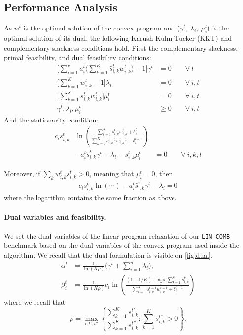 \subsection{Performance Analysis}
As $w^{t}$ is the optimal solution of the convex program and ($\gamma^t,\ \lambda_{i},\ \mu_{i}^{t}$) is the optimal solution of its dual, the following Karush-Kuhn-Tucker (KKT) and complementary slackness conditions hold.
First the complementary slackness, primal feasibility, and dual feasibility conditions:
\begin{align*}
   \biggl[ \sum_{i=1}^{n} a_{i}^{t} \biggl( \sum_{k=1}^{K}  \hat{s}_{i,k}^{t} w_{i,k}^{t} \biggr) - 1 \biggr] \gamma^{t} &= 0 \qquad \forall\ t \\
   \biggl[ \sum_{k=1}^{K}  w_{i,k}^{t}  - 1 \biggr] \lambda_{i} &= 0 \qquad \forall\ i, t \\
   \biggl[ \sum_{k=1}^{K}  s_{i,k}^{t} w_{i,k}^{t} \biggr] \mu_{i}^{t} &= 0 \qquad \forall\ i, t \\
   \gamma^{t}, \lambda_{i}, \mu_{i}^{t} &\geq 0 \qquad \forall\ i, t
\end{align*}
And the stationarity condition:
\begin{align*}
	c_{i} s_{i,k}^{t} & \ln \left( \frac{\sum_{k=1}^{K} s_{i,k}^{t} w_{i,k}^{t} + \delta_{i}^{t}}{\sum_{k=1}^{K}  s_{i,k}^{t-1}w_{i,k}^{t-1}  + \delta_{i}^{t-1}} \right) & \\
    	& - a_{i}^{t} \hat{s}_{i,k}^{t} \gamma^{t} - \lambda_{i} - s_{i,k}^{t} \mu_{i}^{t} &= 0	\qquad \forall\ i,k,t
\end{align*}

Moreover, if $\sum_{k} w_{i,k}^{t} s_{i,k}^{t} > 0$, meaning that $\mu_{i}^{t} = 0$, then
\begin{align}	\label{eq:KKT1}
   c_{i} s_{i,k}^{t} \ln \left( \cdots \right)
    	 - a_{i}^{t} \hat{s}_{i,k}^{t} \gamma^{t} - \lambda_{i}  = 0
\end{align}
where the logarithm contains the same fraction as above.

\paragraph{Dual variables and feasibility.} We set the dual variables of the linear program relaxation of our \texttt{LIN-COMB} benchmark based on the dual variables of the convex program used inside the algorithm. We recall that the dual formulation is visible on \cref{fig:dual}.
%
\begin{align*}
    \alpha^{t} &= \frac{1}{\ln(K\rho)}  \biggl( \gamma^{t} + \sum_{i=1}^{n} \lambda_{i} \biggr), \\
    \beta_{i}^{t} &= \frac{1}{\ln(K\rho)} c_i \ln \left(\frac{ (1 + 1/K) \cdot \max_{t'} \sum_{k=1}^{K} s_{i,k}^{t'}}{\sum_{k=1}^{K}  s_{i,k}^{t-1} w_{i,k}^{t-1} + \delta_{i}^{t-1}}\right)
\end{align*}
%
where we recall that
\[
	\rho = \max_{i, t',t''} \left\{\frac{\sum_{k=1}^{K} s_{i,k}^{t'}}{\sum_{k=1}^{K} s_{i,k}^{t''}} : \sum_{k=1}^{K} s_{i,k}^{t''} > 0 \right\}.
\]

